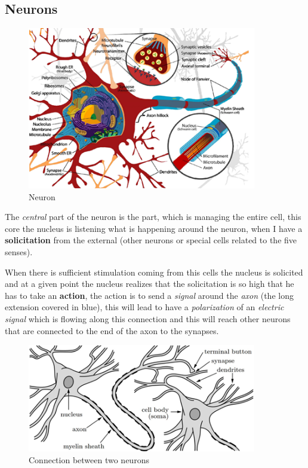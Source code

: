 \documentclass{article}
\begin{document}
\subsection{Neurons}
\begin{figure}[H]
    \centering
    \includegraphics[width=10cm]{images/neuron1.png}
    \caption{Neuron}
    \label{fig:neurone_1}
\end{figure}

The \textit{central} part of the neuron is the part, which is managing the entire cell, this core the
nucleus is listening what is happening around the neuron,
when I have a \textbf{solicitation} from the external (other neurons or special cells related to the five senses).

When there is sufficient stimulation coming from this cells the nucleus is solicited and at a given
point the nucleus realizes that the solicitation is so high that he has to
take an \textbf{action}, the action is to send a \textit{signal} around the \textit{axon} (the long extension covered in blue),
this will lead to have a \textit{polarization} of an \textit{electric signal} which is flowing along this connection
and this will reach other neurons that are connected to the end of the axon to the synapses.

\begin{figure}[H]
    \centering
    \includegraphics[width=10cm]{images/neuron2.png}
    \caption{Connection between two neurons}
    \label{fig:neurone_2}
\end{figure}
\end{document}
